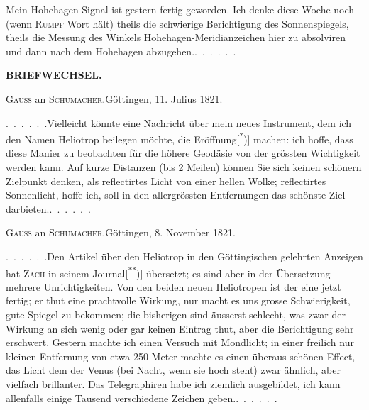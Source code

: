 \par\noindent\hspace*{\parindent}Mein Hohehagen-Signal ist gestern fertig geworden. Ich denke diese Woche noch (wenn \textsc{Rumpf} Wort hält) theils die schwierige Berichtigung des Sonnenspiegels, theils die Messung des Winkels Hohehagen-Meridianzeichen hier zu absolviren und dann nach dem Hohehagen abzugehen.\enspace .\ .\ .\ .\ .\ .

\par\clearpage
\noindent{}\hfill{\small\textbf{BRIEFWECHSEL.}}\hfill\null\par\bigskip
\begin{center}{\large\textsc{Gauss} an \textsc{Schumacher}.\quad Göttingen, 11. Julius 1821.}\end{center}
\par\noindent\hspace*{\parindent}.\ .\ .\ .\ .\ .\enspace Vielleicht könnte eine Nachricht über mein neues Instrument, dem ich den Namen Heliotrop beilegen möchte, die Eröffnung[\textsuperscript{*})] machen: ich hoffe, dass diese Manier zu beobachten für die höhere Geodäsie von der grössten Wichtigkeit werden kann. Auf kurze Distanzen (bis 2 Meilen) können Sie sich keinen schönern Zielpunkt denken, als reflectirtes Licht von einer hellen Wolke; reflectirtes Sonnenlicht, hoffe ich, soll in den allergrössten Entfernungen das schönste Ziel darbieten.\enspace .\ .\ .\ .\ .\ .
\par\bigskip
\begin{center}{\large\textsc{Gauss} an \textsc{Schumacher}.\quad Göttingen, 8. November 1821.}\end{center}
\par\noindent\hspace*{\parindent}.\ .\ .\ .\ .\ .\enspace Den Artikel über den Heliotrop in den Göttingischen gelehrten Anzeigen hat \textsc{Zach} in seinem Journal[\textsuperscript{**})] übersetzt; es sind aber in der Übersetzung mehrere Unrichtigkeiten. Von den beiden neuen Heliotropen ist der eine jetzt fertig; er thut eine prachtvolle Wirkung, nur macht es uns grosse Schwierigkeit, gute Spiegel zu bekommen; die bisherigen sind äusserst schlecht, was zwar der Wirkung an sich wenig oder gar keinen Eintrag thut, aber die Berichtigung sehr erschwert. Gestern machte ich einen Versuch mit Mondlicht; in einer freilich nur kleinen Entfernung von etwa 250 Meter machte es einen überaus schönen Effect, das Licht dem der Venus (bei Nacht, wenn sie hoch steht) zwar ähnlich, aber vielfach brillanter. Das Telegraphiren habe ich ziemlich ausgebildet, ich kann allenfalls einige Tausend verschiedene Zeichen geben.\enspace .\ .\ .\ .\ .\ .
